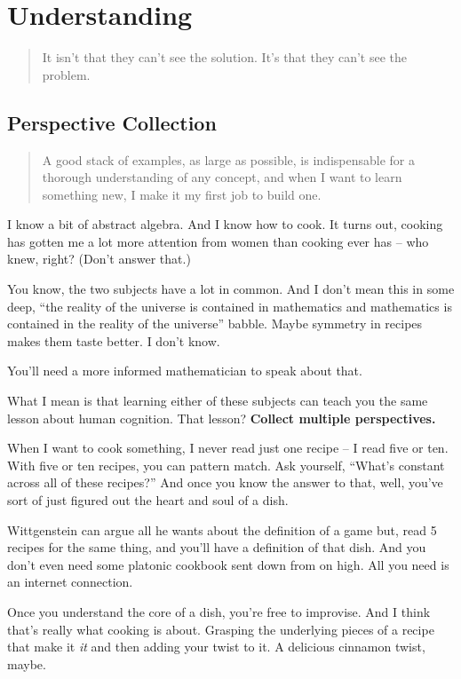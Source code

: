 \chapter{Understanding}

\begin{quote}
It isn't that they can't see the solution. It's that they can't see the problem.
\end{quote}

\section{Perspective Collection}

\begin{quote}
A good stack of examples, as large as possible, is indispensable for a thorough
understanding of any concept, and when I want to learn something new, I make it
my first job to build one.
\end{quote}

I know a bit of abstract algebra. And I know how to cook. It turns out, cooking
has gotten me a lot more attention from women than cooking ever has -- who knew,
right? (Don't answer that.)

You know, the two subjects have a lot in common. And I don't mean this in some
deep, ``the reality of the universe is contained in mathematics and mathematics
is contained in the reality of the universe'' babble. Maybe symmetry in recipes
makes them taste better. I don't know.

You'll need a more informed mathematician to speak about that.

What I mean is that learning either of these subjects can teach you the same
lesson about human cognition. That lesson? \textbf{Collect multiple
  perspectives.}

When I want to cook something, I never read just one recipe -- I read five or
ten. With five or ten recipes, you can pattern match. Ask yourself, ``What's
constant across all of these recipes?'' And once you know the answer to that,
well, you've sort of just figured out the heart and soul of a dish.

Wittgenstein can argue all he wants about the definition of a game but, read 5
recipes for the same thing, and you'll have a definition of that dish. And you
don't even need some platonic cookbook sent down from on high. All you need is
an internet connection.

Once you understand the core of a dish, you're free to improvise. And I think
that's really what cooking is about. Grasping the underlying pieces of a recipe
that make it \textit{it} and then adding your twist to it. A delicious cinnamon
twist, maybe.

